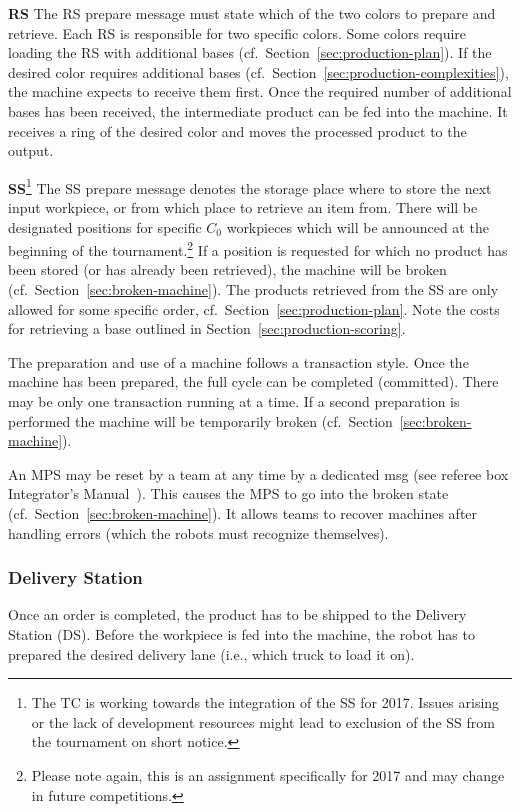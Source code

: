 \documentclass[12pt,twoside]{article}
\newcommand{\refsec}[1]{Section~\ref{#1}}
\begin{document}
\noindent\textbf{RS}
The RS prepare message must state which of the two colors to prepare and
retrieve. Each RS is responsible for two specific colors. Some colors
require loading the RS with additional bases
(cf.~\refsec{sec:production-plan}). If the desired color requires
additional bases (cf.~\refsec{sec:production-complexities}), the
machine expects to receive them first. Once the required number of
additional bases has been received, the intermediate product can be
fed into the machine. It receives a ring of the desired color and
moves the processed product to the output.

\noindent\textbf{SS}\footnote{The TC is working towards the
  integration of the SS for 2017. Issues arising or the lack of
  development resources might lead to exclusion of the SS from the
  tournament on short notice.}
%
The SS prepare message denotes the storage place where to store the
next input workpiece, or from which place to retrieve an item
from. There will be designated positions for specific $C_0$ workpieces
which will be announced at the beginning of the
tournament.\footnote{Please note again, this is an assignment
  specifically for 2017 and may change in future competitions.} If a
position is requested for which no product has been stored (or has
already been retrieved), the machine will be broken
(cf.~\refsec{sec:broken-machine}). The products retrieved from the SS
are only allowed for some specific order,
cf.~\refsec{sec:production-plan}. Note the costs for retrieving a base
outlined in \refsec{sec:production-scoring}.


\medskip
The preparation and use of a machine follows a transaction style. Once the
machine has been prepared, the full cycle can be completed (committed).
There may be only one transaction running at a time. If a
second preparation is performed the machine will
be temporarily broken (cf.~\refsec{sec:broken-machine}).

An MPS may be reset by a team at any time by a dedicated msg (see
referee box Integrator's Manual~\cite{RefBoxIntManual}). This causes
the MPS to go into the broken state
(cf.~\refsec{sec:broken-machine}). It allows teams to recover machines
after handling errors (which the robots must recognize themselves).

\subsubsection{Delivery Station}
\label{sec:delivery-station}
Once an order is completed, the product has to be shipped to the
Delivery Station (DS). Before the workpiece is fed into the machine,
the robot has to prepared the desired delivery lane (i.e., which truck to
load it on).
\end{document}
